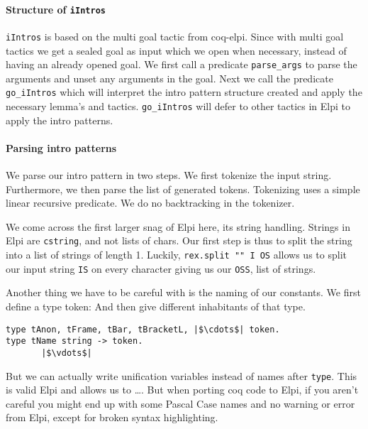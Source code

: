 \documentclass[thesis.tex]{subfiles}
\begin{document}
\paragraph*{Structure of \texttt{iIntros}}
\texttt{iIntros} is based on the multi goal tactic from coq-elpi. Since with multi goal tactics we get a sealed goal as input which we open when necessary, instead of having an already opened goal. We first call a predicate \texttt{parse_args} to parse the arguments and unset any arguments in the goal. Next we call the predicate \texttt{go_iIntros} which will interpret the intro pattern structure created and apply the necessary lemma's and tactics. \texttt{go_iIntros} will defer to other tactics in Elpi to apply the intro patterns.

\paragraph*{Parsing intro patterns}
We parse our intro pattern in two steps. We first tokenize the input string. Furthermore, we then parse the list of generated tokens. Tokenizing uses a simple linear recursive predicate. We do no backtracking in the tokenizer.

We come across the first larger snag of Elpi here, its string handling. Strings in Elpi are \texttt{cstring}, and not lists of chars. Our first step is thus to split the string into a list of strings of length 1. Luckily, \texttt{rex.split "" I OS} allows us to split our input string \texttt{IS} on every character giving us our \texttt{OSS}, list of strings.

Another thing we have to be careful with is the naming of our constants. We first define a type token:  And then give different inhabitants of that type.
\begin{verbatim}
type tAnon, tFrame, tBar, tBracketL, |$\cdots$| token.
type tName string -> token.
       |$\vdots$|
\end{verbatim}
But we can actually write unification variables instead of names after \texttt{type}. This is valid Elpi and allows us to \dots. But when porting coq code to Elpi, if you aren't careful you might end up with some Pascal Case names and no warning or error from Elpi, except for broken syntax highlighting.
\end{document}
